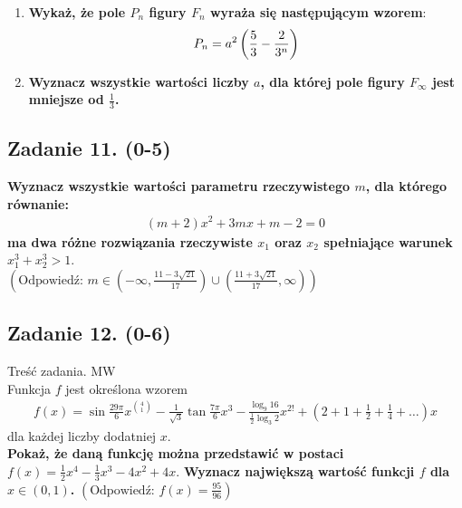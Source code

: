 \documentclass[11pt,a4paper]{scrartcl}
\theoremstyle{definition}
\begin{document}
\begin{figure}[h!] 
\def\svgwidth{0.25\columnwidth} 
\label{maps}

    \qquad
    \centering
    \subfloat{{\def\svgwidth{0.4\columnwidth}
}}%
    \subfloat{{\subfloat{{\def\svgwidth{0.4\columnwidth}
}}}}%
\label{maps}
\end{figure}
\begin{enumerate}
    \item \textbf{Wykaż, że pole $P_{n}$ figury $F_n$ wyraża się następującym wzorem}:
$$
P_n = a^2\left({5\over 3} - {2 \over {3^n}}\right)
$$
\item \textbf{Wyznacz wszystkie wartości liczby $a$, dla której pole figury $F_{\infty}$ jest mniejsze od $\frac{1}{3}$.}

\end{enumerate}












\subsection*{Zadanie 11. (0-5)}
\textbf{Wyznacz wszystkie wartości parametru rzeczywistego $m$, dla którego równanie:}
\begin{align*}
        (m+2)x^{2}+3mx+m-2=0
\end{align*}
\textbf{ma dwa różne rozwiązania rzeczywiste $x_{1}$ oraz $x_{2}$ spełniające warunek $x_{1}^{3}+x_{2}^{3}>1$}. \\

$\left(\text{Odpowiedź: }m\in \left(-\infty,\frac{11-3\sqrt{21}}{17} \right)\cup\left(\frac{11+3\sqrt{21}}{17} ,\infty\right) \right)$

\subsection*{Zadanie 12. (0-6)} 
Treść zadania. MW \\
Funkcja $f$ jest określona wzorem
\begin{align*}
    f(x)= \sin{\frac{29\pi}{6}}x^{\binom{4}{1}}-\frac{1}{\sqrt{3}}\tan{\frac{7\pi}{6}}x^{3}-\frac{\log_{9}{16}}{\frac{1}{2}\log_{3}{2}}x^{2!}+\left(2+1+\frac{1}{2}+\frac{1}{4}+\dots \right)x
\end{align*}
dla każdej liczby dodatniej $x$. \\
\textbf{Pokaż, że daną funkcję można przedstawić w postaci $f(x)=\frac{1}{2}x^{4}-\frac{1}{3}x^{3}-4x^{2}+4x$}.
\textbf{Wyznacz największą wartość funkcji $f$ dla $x\in \left(0,1\right)$.}
$\left(\text{Odpowiedź: } f(x)=\frac{95}{96} \right)$
\end{document}
